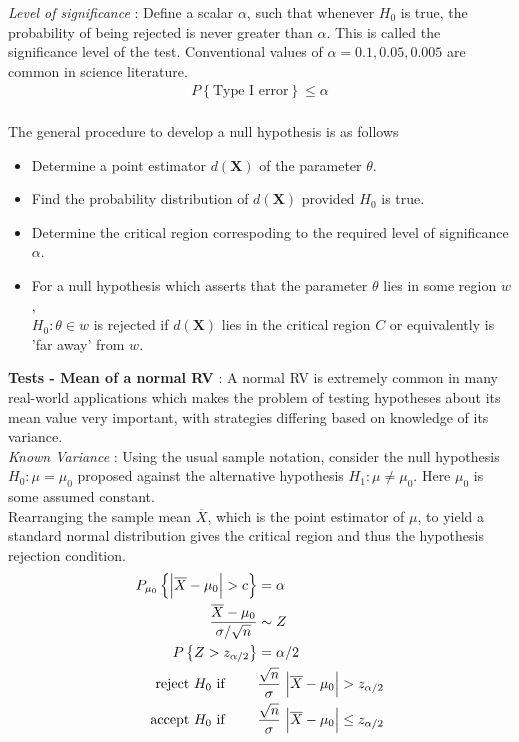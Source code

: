 \textit{Level of significance} : Define a scalar $ \alpha $, such that whenever $ H_0 $ is true, the probability of being rejected is never greater than $ \alpha $. This is called the significance level of the test. Conventional values of $ \alpha = 0.1, 0.05, 0.005 $ are common in science literature.\\

\begin{align}
	P  \left\{\text{Type I error}\right\} \leq \alpha 
\end{align} \\

The general procedure to develop a null hypothesis is as follows \\

\begin{itemize}
	\item Determine a point estimator $ d(\textbf{X}) $ of the parameter $ \theta $.
	\item Find the probability distribution of $ d(\textbf{X}) $ provided $ H_0 $ is true.
	\item Determine the critical region correspoding to the required level of significance $ \alpha $.
	\item For a null hypothesis which asserts that the parameter $ \theta $ lies in some region $ w $, \\
	 $ H_0 : \theta \in w $ is rejected if $ d(\textbf{X}) $ lies in the critical region $ C $ or equivalently is 'far away' from $ w $.
\end{itemize}


\textbf{Tests - Mean of a normal RV} : A normal RV is extremely common in many real-world applications which makes the problem of testing hypotheses about its mean value very important, with strategies differing based on knowledge of its variance. \\

\textit{Known Variance} : Using the usual sample notation, consider the null hypothesis $ H_0 : \mu = \mu_0 $ proposed against the alternative hypothesis $ H_1 : \mu \neq \mu_0 $. Here $ \mu_0 $ is some assumed constant.\\

Rearranging the sample mean $ \overline{X} $, which is the point estimator of $ \mu $, to yield a standard normal distribution gives the critical region and thus the hypothesis rejection condition.
\begin{align}
	P_{\mu_0} \left\{ \Big|\overline{X} - \mu_0\Big|  > c\right\} &= \alpha \\
	\frac{\overline{X} - \mu_0}{\sigma / \sqrt{n}} &\sim Z \nonumber \\
	P \left\{Z > z_{\alpha/2}\right\} &= \alpha/2 \nonumber \\
	\text{reject $ H_0 $ if } \qquad & \frac{\sqrt{n}}{\sigma}\ \Big| \overline{X} - \mu_0 \Big| > z_{\alpha/2} \\
	\text{accept $ H_0 $ if } \qquad & \frac{\sqrt{n}}{\sigma}\ \Big| \overline{X} - \mu_0 \Big| \leq z_{\alpha/2}
\end{align} \\

